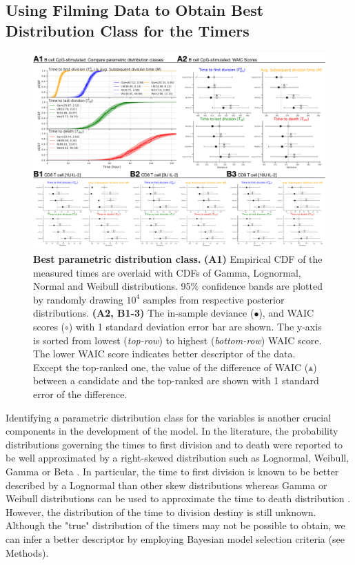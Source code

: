 \documentclass[11pt, a4paper]{article}
\begin{document}
\nolinenumbers
\subsection{Using Filming Data to Obtain Best Distribution Class for the Timers}
\label{sec:distribution_class}
\begin{figure}[t]
    \centering
    \includegraphics[scale=0.45]{figs/fig4.pdf}
    \caption{\textbf{Best parametric distribution class.} \textbf{(A1)} Empirical CDF of the measured times are overlaid with CDFs of Gamma, Lognormal, Normal and Weibull distributions. 95\% confidence bands are plotted by randomly drawing $10^4$ samples from respective posterior distributions. \textbf{(A2, B1-3)} The in-sample deviance ($\bullet$), and WAIC scores ($\circ$) with 1 standard deviation error bar are shown. The y-axis is sorted from lowest (\textit{top-row}) to highest (\textit{bottom-row}) WAIC score. The lower WAIC score indicates better descriptor of the data. Except the top-ranked one, the value of the difference of WAIC (\textcolor{gray}{$\blacktriangle$}) between a candidate and the top-ranked are shown with 1 standard error of the difference.}
    \label{fig:best_distribution}
\end{figure}
Identifying a parametric distribution class for the variables is another crucial components in the development of the model. In the literature, the probability distributions governing the times to first division and to death were reported to be well approximated by a right-skewed distribution such as Lognormal, Weibull, Gamma or Beta \parencite{Hawkins.2009}. In particular, the time to first division is known to be better described by a Lognormal than other skew distributions whereas Gamma or Weibull distributions can be used to approximate the time to death distribution \parencite{Hawkins.2007}. However, the distribution of the time to division destiny is still unknown. Although the "true" distribution of the timers may not be possible to obtain, we can infer a better descriptor by employing Bayesian model selection criteria (see Methods).
\end{document}
